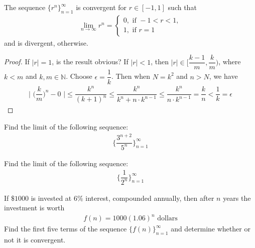 \begin{theorem}
The sequence $\{r^{n}\}_{n=1}^{\infty}$ is convergent for $r \in [-1, 1]$ such that
\begin{align*}
    \lim_{n \longrightarrow \infty} r^{n} = \begin{cases}
    0, \hspace{4pt} \text{if} \hspace{4pt} -1 < r < 1,\\[2ex]
    1, \hspace{4pt} \text{if} \hspace{4pt} r = 1
    \end{cases}
\end{align*}
and is divergent, otherwise.
\label{geometric_term_sequence}
\begin{proof}
    If $\lvert r \rvert = 1$, is the result obvious? If $\lvert r \rvert < 1$, then $\lvert r \rvert \in \Big[\dfrac{k-1}{m}, \dfrac{k}{m}\Big)$, where $k < m$ and $k, m \in \mathbb{N}$. Choose $\epsilon = \dfrac{1}{k}$. Then when $N = k^{2}$ and $n > N$, we have
    \begin{align*}
        \Big|\hspace{4pt} \Big(\dfrac{k}{m}\Big)^{n} - 0 \hspace{4pt} \Big| \leq \dfrac{k^{n}}{(k+1)^{n}} \leq \dfrac{k^{n}}{k^{n} + n \cdot k^{n-1}} \leq \dfrac{k^{n}}{n \cdot k^{n-1}} = \dfrac{k}{n} < \dfrac{1}{k} = \epsilon
    \end{align*}
\end{proof}
\end{theorem}

\begin{exercise}
Find the limit of the following sequence:
\begin{align*}
    \Big\{\dfrac{3^{n+2}}{5^{n}}\Big\}_{n=1}^{\infty}
\end{align*}
\end{exercise}

\begin{exercise}
Find the limit of the following sequence:
\begin{align*}
    \Big\{\dfrac{1}{2^{n}}\Big\}_{n=1}^{\infty}
\end{align*}
\end{exercise}

\begin{exercise}
If $\$1000$ is invested at $6\%$ interest, compounded annually, then after $n$ years the investment is worth
\begin{align*}
    f(n) = 1000(1.06)^{n} \hspace{4pt} \text{dollars}
\end{align*}
Find the first five terms of the sequence $\{f(n)\}_{n=1}^{\infty}$ and determine whether or not it is convergent.
\end{exercise}

